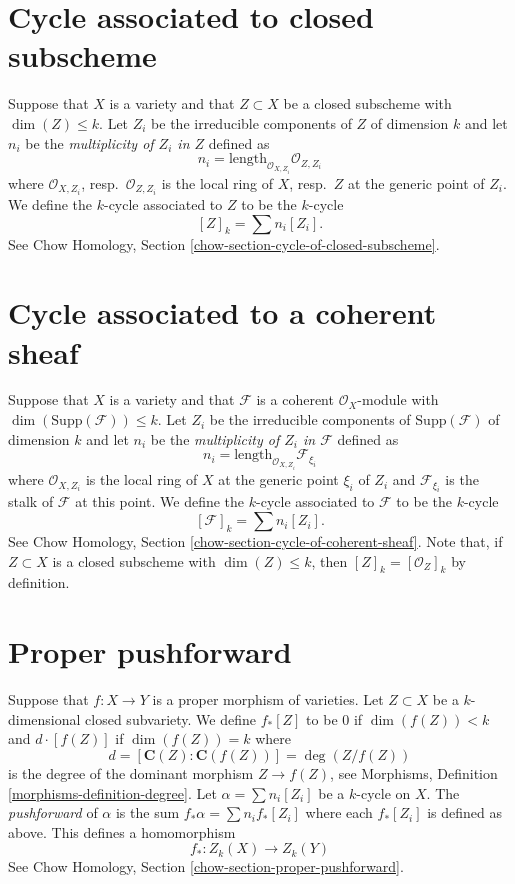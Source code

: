 \section{Cycle associated to closed subscheme}
\label{section-cycle-of-closed}

\noindent
Suppose that $X$ is a variety and that $Z \subset X$ be a closed subscheme
with $\dim(Z) \leq k$. Let $Z_i$ be the irreducible components of $Z$ of
dimension $k$ and let $n_i$ be the {\it multiplicity of $Z_i$ in $Z$}
defined as
$$
n_i = \text{length}_{\mathcal{O}_{X, Z_i}} \mathcal{O}_{Z, Z_i}
$$
where $\mathcal{O}_{X, Z_i}$, resp.\ $\mathcal{O}_{Z, Z_i}$ is the
local ring of $X$, resp.\ $Z$ at the generic point of $Z_i$.
We define the $k$-cycle associated to $Z$ to be the $k$-cycle
$$
[Z]_k = \sum n_i [Z_i].
$$
See Chow Homology, Section \ref{chow-section-cycle-of-closed-subscheme}.


\section{Cycle associated to a coherent sheaf}
\label{section-cycle-of-coherent-sheaf}

\noindent
Suppose that $X$ is a variety and that
$\mathcal{F}$ is a coherent $\mathcal{O}_X$-module with
$\dim(\text{Supp}(\mathcal{F})) \leq k$.
Let $Z_i$ be the irreducible components of $\text{Supp}(\mathcal{F})$
of dimension $k$ and let $n_i$ be the
{\it multiplicity of $Z_i$ in $\mathcal{F}$} defined as
$$
n_i = \text{length}_{\mathcal{O}_{X, Z_i}} \mathcal{F}_{\xi_i}
$$
where $\mathcal{O}_{X, Z_i}$ is the
local ring of $X$ at the generic point $\xi_i$ of $Z_i$
and $\mathcal{F}_{\xi_i}$ is the stalk of $\mathcal{F}$ at this point.
We define the $k$-cycle associated to $\mathcal{F}$ to be the $k$-cycle
$$
[\mathcal{F}]_k = \sum n_i [Z_i].
$$
See Chow Homology, Section \ref{chow-section-cycle-of-coherent-sheaf}.
Note that, if $Z \subset X$ is a closed subscheme with $\dim(Z) \leq k$, then
$[Z]_k = [\mathcal{O}_Z]_k$ by definition.


\section{Proper pushforward}
\label{section-pushforward}

\noindent
Suppose that $f : X \to Y$ is a proper morphism of varieties.
Let $Z \subset X$ be a $k$-dimensional
closed subvariety. We define $f_*[Z]$ to be $0$ if $\dim(f(Z)) < k$
and $d \cdot [f(Z)]$ if $\dim(f(Z)) = k$ where
$$
d = [\mathbf{C}(Z) : \mathbf{C}(f(Z))] = \deg(Z/f(Z))
$$
is the degree of the dominant morphism $Z \to f(Z)$, see
Morphisms, Definition \ref{morphisms-definition-degree}.
Let $\alpha = \sum n_i [Z_i]$ be a $k$-cycle on $X$. The
{\it pushforward} of $\alpha$ is the sum $f_* \alpha = \sum n_i f_*[Z_i]$
where each $f_*[Z_i]$ is defined as above. This defines a homomorphism
$$
f_* : Z_k(X) \longrightarrow Z_k(Y)
$$
See Chow Homology, Section \ref{chow-section-proper-pushforward}.

